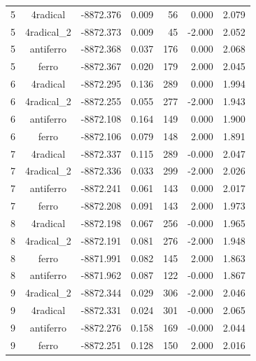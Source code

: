 \begin{longtable}{@{}ccrrrrr@{}}
\rowcolor{gray!20} 5 & 4radical & -8872.376 & 0.009 & 56 & 0.000 & 2.079 \\
5 & 4radical\_2 & -8872.373 & 0.009 & 45 & -2.000 & 2.052 \\
5 & antiferro & -8872.368 & 0.037 & 176 & 0.000 & 2.068 \\
5 & ferro & -8872.367 & 0.020 & 179 & 2.000 & 2.045 \\
\rowcolor{gray!20} 6 & 4radical & -8872.295 & 0.136 & 289 & 0.000 & 1.994 \\
6 & 4radical\_2 & -8872.255 & 0.055 & 277 & -2.000 & 1.943 \\
6 & antiferro & -8872.108 & 0.164 & 149 & 0.000 & 1.900 \\
6 & ferro & -8872.106 & 0.079 & 148 & 2.000 & 1.891 \\
\rowcolor{gray!20} 7 & 4radical & -8872.337 & 0.115 & 289 & -0.000 & 2.047 \\
7 & 4radical\_2 & -8872.336 & 0.033 & 299 & -2.000 & 2.026 \\
7 & antiferro & -8872.241 & 0.061 & 143 & 0.000 & 2.017 \\
7 & ferro & -8872.208 & 0.091 & 143 & 2.000 & 1.973 \\
\rowcolor{gray!20} 8 & 4radical & -8872.198 & 0.067 & 256 & -0.000 & 1.965 \\
8 & 4radical\_2 & -8872.191 & 0.081 & 276 & -2.000 & 1.948 \\
8 & ferro & -8871.991 & 0.082 & 145 & 2.000 & 1.863 \\
8 & antiferro & -8871.962 & 0.087 & 122 & -0.000 & 1.867 \\
\rowcolor{gray!20} 9 & 4radical\_2 & -8872.344 & 0.029 & 306 & -2.000 & 2.046 \\
9 & 4radical & -8872.331 & 0.024 & 301 & -0.000 & 2.065 \\
9 & antiferro & -8872.276 & 0.158 & 169 & -0.000 & 2.044 \\
9 & ferro & -8872.251 & 0.128 & 150 & 2.000 & 2.016 \\
\end{longtable}
